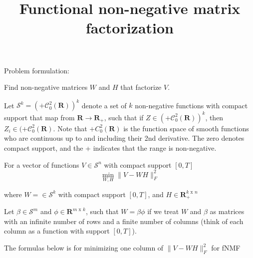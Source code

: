 \documentclass{article}
\title{Functional non-negative matrix factorization}
\begin{document}
  \maketitle

  Problem formulation:
  
  Find non-negative matrices $W$ and $H$ that factorize $V$.

  Let $\mathcal{S}^k = (+\mathcal{C}_0^2(\mathbf{R}))^k$ denote a set of $k$ non-negative functions with compact support that map from $\mathbf{R} \rightarrow \mathbf{R}_+$, such that if $Z \in (+\mathcal{C}_0^2(\mathbf{R}))^k$, then $Z_i \in (+\mathcal{C}_0^2(\mathbf{R})$.
  Note that $+C_0^2(\mathbf{R})$ is the function space of smooth functions who are continuous up to and including their 2nd derivative. The zero denotes compact support, and the + indicates that the range is non-negative.

  For a vector of functions $V \in \mathcal{S}^n$ with compact support $[0, T]$
  \[
  \min_{W,H} \|V - W H\|_F^2
  \]

  where $W = \in \mathcal{S}^k$ with compact support $[0, T]$, and $H \in \mathbf{R}_+^{k \text{ x } n}$

  Let $\beta \in \mathcal{S}^m$ and $\phi \in \mathbf{R}^{m \text{ x } k}$, such that $W = \beta \phi$ if we treat $W$ and $\beta$ as matrices with an infinite number of rows and a finite number of columns (think of each column as a function with support $[0,T]$).

  The formulas below is for minimizing one column of $\|V - W H\|_F^2$ for fNMF

  
  
\end{document}
